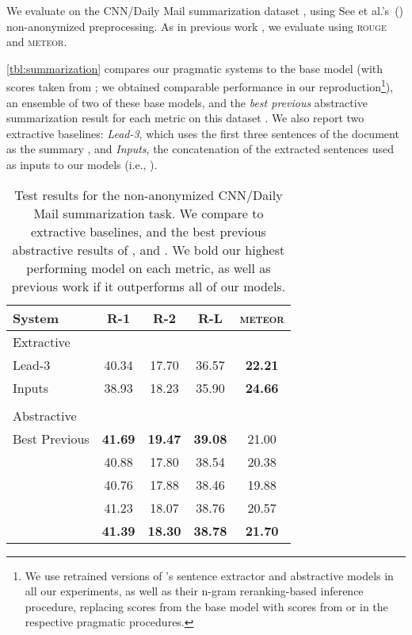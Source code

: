 \documentclass[11pt,a4paper]{article}
\newcommand{\basespk}[0]{\xspace}
\newcommand{\pragd}[0]{\xspace}
\newcommand{\pragr}[0]{\xspace}
\newcommand{\meteor}{\textsc{meteor}\xspace}
\newcommand{\rouge}{\textsc{rouge}\xspace}
\newcommand{\phan}{\phantom{}}
\newcommand{\ie}{i.e., }
\begin{document}
We evaluate on the CNN/Daily Mail summarization dataset \cite{hermann2015teaching,nallapati2016abstractive}, using See et al.'s~(\citeyear{see2017summarization}) non-anonymized preprocessing. As in previous work \cite{chen2018fast},  we evaluate using \rouge and \meteor.

\autoref{tbl:summarization} compares our pragmatic systems to the base \basespk model (with scores taken from \citet{chen2018fast}; we obtained comparable performance in our reproduction\footnote{We use retrained versions of \citet{chen2018fast}'s sentence extractor and abstractive \basespk models in all our experiments, as well as their n-gram reranking-based inference procedure, replacing scores from the base model \basespk with scores from \pragr or \pragd in the respective pragmatic procedures.}), an ensemble of two of these base models, and the \emph{best previous} abstractive summarization result for each metric on this dataset \cite{celikyilmaz2018communicating,paulus2018summarization,chen2018fast}.
We also report two extractive baselines: \emph{Lead-3}, which uses the first three sentences of the document as the summary \cite{see2017summarization}, and \emph{Inputs}, the concatenation of the extracted sentences 
used as inputs to our models (\ie ).


\begin{table}[t]
\centering
\small
\begin{tabular}{lcccc}
\toprule
System & R-1 & R-2 & R-L & \meteor \\
\midrule
Extractive \\
\midrule
Lead-3 & 40.34\phan & 17.70\phan & 36.57\phan & {\bf 22.21}\phan \\
Inputs & 38.93\phan & 18.23\phan & 35.90\phan & {\bf 24.66}\phan \\
\\
Abstractive \\
\midrule
Best Previous & {\bf 41.69} & {\bf 19.47} & {\bf 39.08} & 21.00 \\
\midrule
\basespk & 40.88\phan & 17.80\phan & 38.54\phan & 20.38\phan \\ \basespk   & 40.76\phan & 17.88\phan & 38.46\phan & 19.88\phan \\ \pragr & 41.23\phan & 18.07\phan & 38.76\phan & 20.57\phan \\ \pragd & {\bf 41.39}\phan & {\bf 18.30}\phan & {\bf 38.78}\phan & {\bf 21.70}\phan \\ \bottomrule
\end{tabular}
\caption{\label{tbl:summarization}Test results for the non-anonymized CNN/Daily Mail summarization task. We compare to extractive baselines, and the best previous abstractive results of \citet{celikyilmaz2018communicating},
\citet{paulus2018summarization} and \citet{chen2018fast}.
We bold our highest performing model on each metric, as well as previous work if it outperforms all of our models.
}
\end{table}
\end{document}
